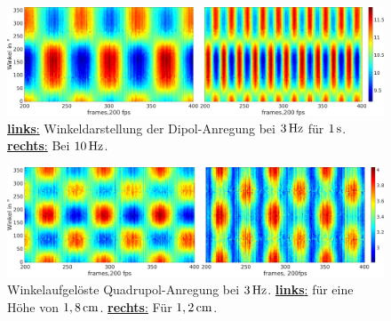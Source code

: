 \documentclass[numbers=noenddot,a4paper]{scrartcl}
\newcommand{\fett}[1]{\textbf{#1}}
\begin{document}
				\begin{figure}[!b]
			       	\centering
			       	\includegraphics[width=\textwidth,height=0.35\textwidth]{figs/auswertung/randdipol3hzu10Hz1sekwink.png}
			       	\caption{\underline{\fett{links}:} Winkeldarstellung der Dipol-Anregung bei $\unit[3]{Hz}$ für $\unit[1]{s}$. \underline{\fett{rechts}:} Bei $\unit[10]{Hz}$.}
			       	\label{img:randfrequenz}
				\end{figure}

				\begin{figure}[!t]
					 \centering
					 \includegraphics[width=\textwidth,height=0.35\textwidth]{figs/auswertung/randhochutiefquad3Hz1sekwink.png}
					 \caption{Winkelaufgelöste Quadrupol-Anregung bei $\unit[3]{Hz}$. \underline{\fett{links}:} für eine Höhe von $\unit[1,8]{cm}$. \underline{\fett{rechts}:} Für $\unit[1,2]{cm}$.}
					 \label{img:randhochutiefwink}
				\end{figure}
\end{document}
